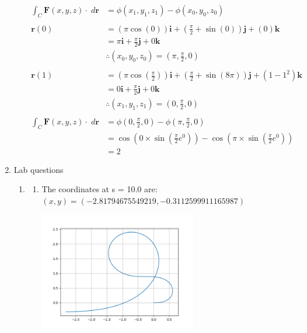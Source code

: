 \documentclass[a4paper,11pt]{article}
\begin{document}
\begin{preview}
\begin{enumerate}
\begin{enumerate}
    \begin{align*}
        \int_C \textbf{F}(x,y,z) \cdot \; d \textbf{r} &= \phi(x_1, y_1, z_1) - \phi(x_0, y_0, z_0)\\\\
        \textbf{r}(0) &= \left( \pi \cos(0) \right) \textbf{i} + \left( \frac{\pi}{2} + \sin(0) \right) \textbf{j}  + \left(0\right) \textbf{k}\\
        &= \pi \textbf{i} + \frac{\pi}{2} \textbf{j} + 0 \textbf{k}\\
        &\therefore (x_0, y_0, z_0) = (\pi, \frac{\pi}{2}, 0)\\\\
        \textbf{r}(1) &= \left( \pi \cos(\frac{\pi}{2}) \right) \textbf{i} + \left( \frac{\pi}{2} + \sin(8 \pi) \right) \textbf{j}  + \left(1-1^2\right) \textbf{k}\\
        &= 0 \textbf{i} + \frac{\pi}{2} \textbf{j} + 0 \textbf{k}\\
        &\therefore (x_1, y_1, z_1) = (0, \frac{\pi}{2}, 0)\\\\
        \int_C \textbf{F}(x,y,z) \cdot \; d \textbf{r} &= \phi(0, \frac{\pi}{2}, 0) - \phi(\pi, \frac{\pi}{2}, 0)\\
        &= \cos(0 \times \sin(\frac{\pi}{2} e^0)) - \cos(\pi \times \sin(\frac{\pi}{2} e^0))\\
        &= 2
    \end{align*}


\end{enumerate}

\item Lab questions

\begin{enumerate}
    \item
\begin{enumerate}
    \item The coordinates at s = 10.0 are: $(x,y) = (-2.81794675549219,-0.3112599911165987)$
    
    \begin{center}
        \includegraphics[width = 0.6\textwidth]{Figure_1.png}
    \end{center}


\end{enumerate}
\end{enumerate}
\end{enumerate}
\end{preview}
\end{document}
